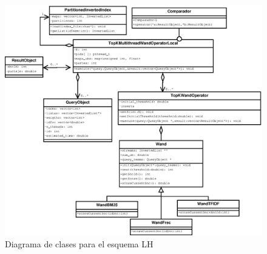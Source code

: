 \begin{figure}[!ht]
\centering
\includegraphics[scale=.75]{images/TopKMultiThreadWandOperatorLocal.eps}
\caption{Diagrama de clases para el esquema LH}
\label{fig:TopKMultiThreadWandOperatorLocal}
\end{figure}

